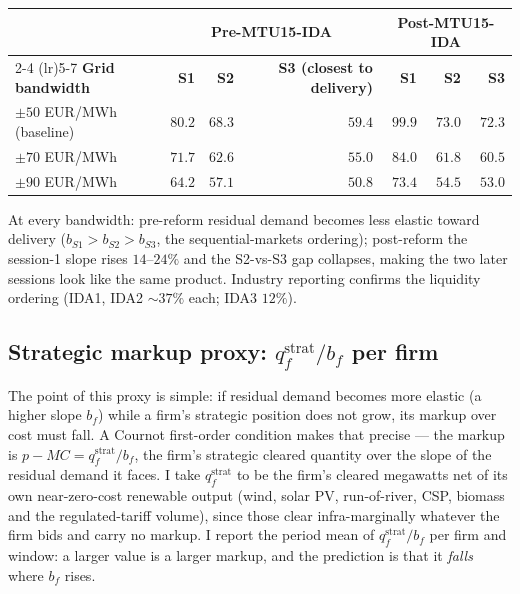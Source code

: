 \documentclass[11pt,a4paper]{article}
\theoremstyle{definition}
\theoremstyle{remark}
\theoremstyle{plain}
\begin{document}
\begin{center}
\footnotesize
\setlength{\tabcolsep}{6pt}
\begin{tabular}{l r r r r r r}
\toprule
                  & \multicolumn{3}{c}{\textbf{Pre-MTU15-IDA}} & \multicolumn{3}{c}{\textbf{Post-MTU15-IDA}} \\
\cmidrule(lr){2-4} \cmidrule(lr){5-7}
\textbf{Grid bandwidth} & \textbf{S1} & \textbf{S2} & \textbf{S3 (closest to delivery)} & \textbf{S1} & \textbf{S2} & \textbf{S3} \\
\midrule
$\pm 50$ EUR/MWh (baseline) & $80.2$ & $68.3$ & $59.4$ & $\mathbf{99.9}$ & $73.0$ & $72.3$ \\
$\pm 70$ EUR/MWh            & $71.7$ & $62.6$ & $55.0$ & $\mathbf{84.0}$ & $61.8$ & $60.5$ \\
$\pm 90$ EUR/MWh            & $64.2$ & $57.1$ & $50.8$ & $\mathbf{73.4}$ & $54.5$ & $53.0$ \\
\bottomrule
\end{tabular}
\label{tab:per-session-bmt}
\end{center}

At every bandwidth: pre-reform residual demand becomes less elastic toward delivery ($b_{S1}>b_{S2}>b_{S3}$, the sequential-markets ordering); post-reform the session-1 slope rises $14$--$24\%$ and the S2-vs-S3 gap collapses, making the two later sessions look like the same product. Industry reporting confirms the liquidity ordering (IDA1, IDA2 ${\sim}37\%$ each; IDA3 $12\%$).

\subsection{Strategic markup proxy: $q_f^{\text{strat}}/b_f$ per firm}\label{app:strategic-markup}

The point of this proxy is simple: if residual demand becomes more elastic (a higher slope $b_f$) while a firm's strategic position does not grow, its markup over cost must fall. A Cournot first-order condition makes that precise --- the markup is $p - MC = q_f^{\text{strat}}/b_f$, the firm's strategic cleared quantity over the slope of the residual demand it faces. I take $q_f^{\text{strat}}$ to be the firm's cleared megawatts net of its own near-zero-cost renewable output (wind, solar PV, run-of-river, CSP, biomass and the regulated-tariff volume), since those clear infra-marginally whatever the firm bids and carry no markup. I report the period mean of $q_f^{\text{strat}}/b_f$ per firm and window: a larger value is a larger markup, and the prediction is that it \emph{falls} where $b_f$ rises.
\end{document}
